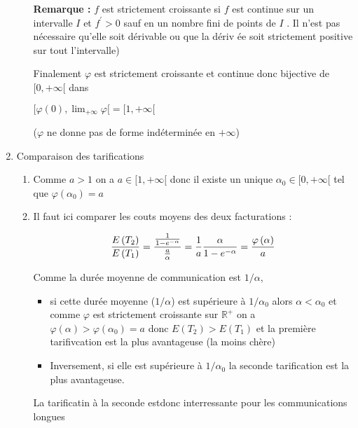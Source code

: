 \documentclass[a4paper, 11pt,reqno]{article}
\begin{document}
\begin{enumerate}
\begin{enumerate}
\textbf{Remarque : }$f$ est strictement croissante si $f$ est continue sur
un intervalle $I$ et $f^{\prime }>0$ sauf en un nombre fini de points de $I$
. Il n'est pas n\'{e}cessaire qu'elle soit d\'{e}rivable ou que la d\'{e}riv%
\'{e}e soit strictement positive sur tout l'intervalle)

Finalement $\varphi $ est strictement croissante et continue donc bijective
de $[0,+\infty [$ dans

$[\varphi \left( 0\right) ,\lim_{+\infty }\varphi [=[1,+\infty [$

($\varphi $ ne donne pas de forme ind\'{e}termin\'{e}e en $+\infty $)
\end{enumerate}

\item Comparaison des tarifications

\begin{enumerate}
\item Comme $a>1$ on a $a\in [1,+\infty [$ donc il existe un unique $\alpha
_{0}\in [0,+\infty [$ tel que $\varphi \left( \alpha _{0}\right) =a$

\item Il faut ici comparer les couts moyens des deux facturations :

\begin{equation*}
\frac{E\left( T_{2}\right) }{E\left( T_{1}\right) }=\frac{\frac{1}{%
1-e^{-\alpha }}}{\frac{a}{\alpha }}=\frac{1}{a}\frac{\alpha }{1-e^{-\alpha }}%
=\frac{\varphi \left( \alpha \right) }{a}
\end{equation*}

Comme la dur\'{e}e moyenne de communication est $1/\alpha $,

\begin{itemize}
\item si cette dur\'{e}e moyenne ($1/\alpha $) est sup\'{e}rieure \`{a} $%
1/\alpha _{0}$ alors $\alpha <\alpha _{0}$ et comme $\varphi $ est
strictement croissante sur $\mathbb{R}^{+}$ on a $\varphi \left( \alpha
\right) >\varphi \left( \alpha _{0}\right) =a$ donc $E\left( T_{2}\right)
>E\left( T_{1}\right) $ et la premi\`{e}re tarifivcation est la plus
avantageuse (la moins ch\`{e}re)

\item Inversement, si elle est sup\'{e}rieure \`{a} $1/\alpha _{0}$ la
seconde tarification est la plus avantageuse.
\end{itemize}

La tarificatin \`{a} la seconde estdonc interressante pour les
communications longues
\end{enumerate}
\end{enumerate}
\end{document}
